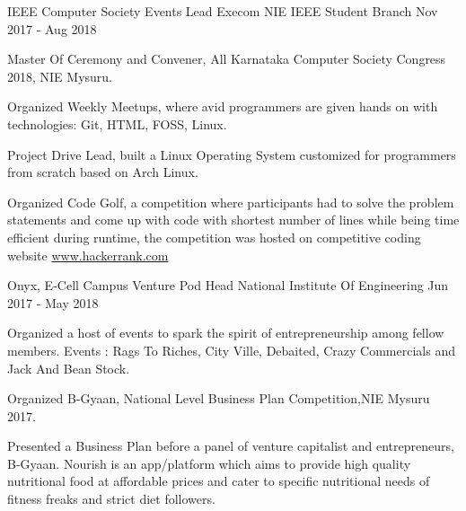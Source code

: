 

\begin{cventries}

  \cventry
    {IEEE Computer Society} %
    {Events Lead Execom} %
    {NIE IEEE Student Branch} %
    {Nov 2017 - Aug 2018} %
    {
      \begin{cvitems} %
        \item {Master Of Ceremony and Convener, All Karnataka Computer Society Congress 2018, NIE Mysuru.}
        \item {Organized Weekly Meetups, where avid programmers are given hands on with technologies: Git, HTML, FOSS, Linux.}
        \item {Project Drive Lead, built a Linux Operating System customized for programmers from scratch based on Arch Linux.}
         \item {Organized Code Golf, a competition where participants had to solve the problem statements and come up with code with shortest number of lines while being time efficient during runtime, the competition was hosted on competitive coding website \href{https://www.hackerrank.com}{www.hackerrank.com}}
      \end{cvitems}
    }

  \cventry
    {Onyx, E-Cell} %
    {Campus Venture Pod Head} %
    {National Institute Of Engineering} %
    {Jun 2017 - May 2018} %
    {
      \begin{cvitems} %
        \item {Organized a host of events to spark the spirit of entrepreneurship among fellow members. Events : Rags To Riches, City Ville, Debaited, Crazy Commercials and Jack And Bean Stock.}
        \item {Organized B-Gyaan, National Level Business Plan Competition,NIE Mysuru 2017.}
        \item {Presented a Business Plan before a panel of venture capitalist and entrepreneurs, B-Gyaan. Nourish is an app/platform which aims to provide high quality nutritional food at affordable prices and cater to specific nutritional needs of fitness freaks and strict diet followers.}
      \end{cvitems}
    }


\end{cventries}
